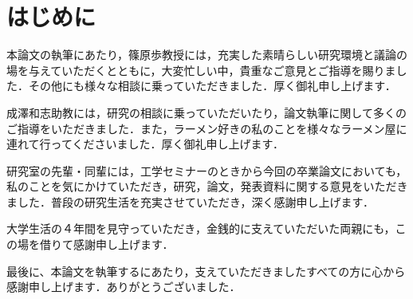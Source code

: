 \section*{はじめに}
本論文の執筆にあたり，篠原歩教授には，充実した素晴らしい研究環境と議論の場を与えていただくとともに，大変忙しい中，貴重なご意見とご指導を賜りました．その他にも様々な相談に乗っていただきました．厚く御礼申し上げます．

成澤和志助教には，研究の相談に乗っていただいたり，論文執筆に関して多くのご指導をいただきました．また，ラーメン好きの私のことを様々なラーメン屋に連れて行ってくださいました．厚く御礼申し上げます．

研究室の先輩・同輩には，工学セミナーのときから今回の卒業論文においても，私のことを気にかけていただき，研究，論文，発表資料に関する意見をいただきました．普段の研究生活を充実させていただき，深く感謝申し上げます．

大学生活の４年間を見守っていただき，金銭的に支えていただいた両親にも，この場を借りて感謝申し上げます．

最後に、本論文を執筆するにあたり，支えていただきましたすべての方に心から感謝申し上げます．ありがとうございました．
